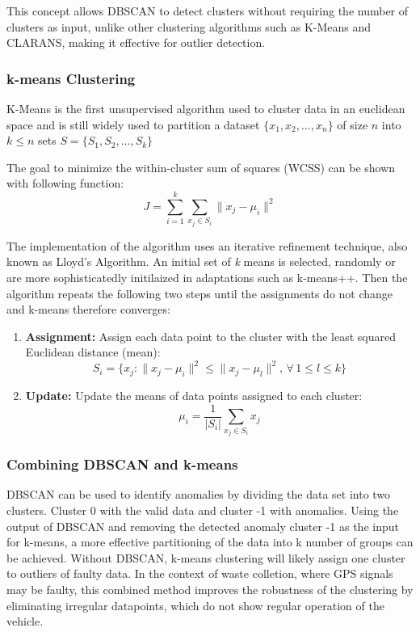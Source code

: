 \documentclass[a4paper,12pt,twoside]{scrreprt}
\begin{document}
This concept allows DBSCAN to detect clusters without
requiring the number of clusters as input, unlike other clustering algorithms
such as K-Means and CLARANS, making it effective for outlier detection.
\cite{ester_density-based_nodate}

\subsubsection{k-means Clustering}
K-Means is the first unsupervised algorithm used to cluster data in an
euclidean space and is still widely used to partition a dataset
$ \{x_1, x_2, \dots, x_n\}$ of size
$n$ into $k \leq n$ sets $S = \{S_1, S_2, \dots, S_k\}$ \cite{sinaga_pdf_2024}

The goal to minimize the within-cluster sum of squares (WCSS) can be shown with
following function:
\[
  J = \sum_{i=1}^{k} \sum_{x_j \in S_i} \| x_j - \mu_i \|^2
\]

The implementation of the algorithm uses an iterative refinement technique,
also known as Lloyd's Algorithm.
An initial set of \textit{k} means is selected, randomly or are more
sophisticatedly initilaized in adaptations such as k-means++.
Then the algorithm repeats the following two steps until the assignments do not
change and k-means therefore converges:

\begin{enumerate}
  \item \textbf{Assignment:} Assign each data point to the cluster with the
        least squared Euclidean distance (mean):
        \[
          S_i = \{x_j : \| x_j - \mu_i \|^2 \leq \| x_j - \mu_l \|^2, \,
          \forall \, 1
          \leq l \leq k\}
        \]
  \item \textbf{Update:} Update the means of data points assigned to each
        cluster:
        \[
          \mu_i = \frac{1}{|S_i|} \sum_{x_j \in S_i} x_j
        \]
\end{enumerate}

\subsubsection{Combining DBSCAN and k-means}
DBSCAN can be used to identify anomalies by dividing the data set into two
clusters. Cluster 0 with the valid data and cluster -1 with anomalies. Using
the output of DBSCAN and removing the detected anomaly cluster -1 as the input
for k-means, a more effective partitioning of the data into k number of groups
can be achieved.
Without DBSCAN, k-means clustering will likely assign one cluster to outliers
of faulty data.
In the context of waste colletion, where GPS signals may be faulty, this
combined method improves the robustness of the clustering by eliminating
irregular datapoints, which do not show regular operation of the vehicle.
\end{document}

